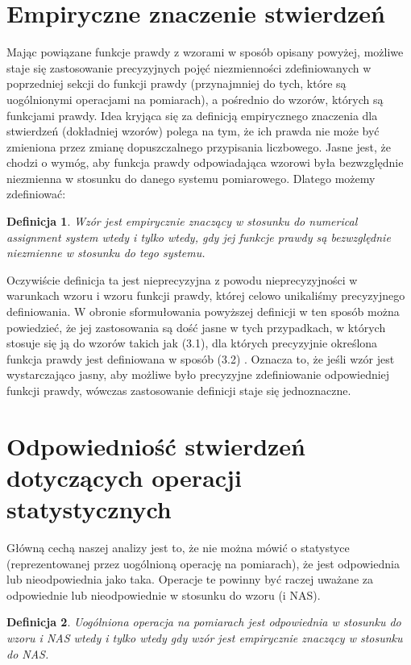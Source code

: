 \documentclass[12pt,a4paper]{report}
\newtheorem{definition}{Definicja}[chapter]
\begin{document}
\section{Empiryczne znaczenie stwierdzeń}

Mając powiązane funkcje prawdy z wzorami w sposób opisany powyżej, możliwe staje się zastosowanie precyzyjnych pojęć niezmienności zdefiniowanych w poprzedniej sekcji do funkcji prawdy (przynajmniej do tych, które są uogólnionymi operacjami na pomiarach), a pośrednio do wzorów, których są funkcjami prawdy. Idea kryjąca się za definicją empirycznego znaczenia dla stwierdzeń (dokładniej wzorów) polega na tym, że ich prawda nie może być zmieniona przez zmianę dopuszczalnego przypisania liczbowego. Jasne jest, że chodzi o wymóg, aby funkcja prawdy odpowiadająca wzorowi była bezwzględnie niezmienna w stosunku do danego systemu pomiarowego. Dlatego możemy zdefiniować:
\begin{definition}
Wzór jest empirycznie znaczący w stosunku do numerical assignment system wtedy i tylko wtedy, gdy jej funkcje prawdy są bezwzględnie niezmienne w stosunku do  tego systemu.
\end{definition}
Oczywiście definicja ta jest nieprecyzyjna z powodu nieprecyzyjności w warunkach wzoru i wzoru funkcji prawdy, której celowo unikaliśmy precyzyjnego definiowania. W obronie sformułowania powyższej definicji w ten sposób można powiedzieć, że jej zastosowania są dość jasne w tych przypadkach, w których stosuje się ją do wzorów takich jak (3.1), dla których precyzyjnie określona funkcja prawdy jest definiowana w sposób (3.2) . Oznacza to, że jeśli wzór jest wystarczająco jasny, aby możliwe było precyzyjne zdefiniowanie odpowiedniej funkcji prawdy, wówczas zastosowanie definicji staje się jednoznaczne.
\section{Odpowiedniość stwierdzeń dotyczących operacji statystycznych}

Główną cechą naszej analizy jest to, że nie można mówić o statystyce (reprezentowanej przez uogólnioną operację na pomiarach), że jest odpowiednia lub nieodpowiednia jako taka. Operacje te powinny być raczej uważane za odpowiednie lub nieodpowiednie w stosunku do wzoru (i NAS).
\begin{definition}
Uogólniona operacja na pomiarach jest odpowiednia w stosunku do wzoru i NAS wtedy i tylko wtedy gdy wzór jest empirycznie znaczący w stosunku do NAS.
\end{definition}
\end{document}
